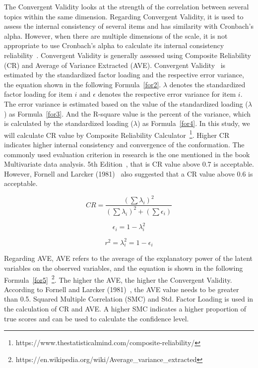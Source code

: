 The Convergent Validity looks at the strength of the correlation between several topics within the same dimension. 
Regarding Convergent Validity, it is used to assess the internal consistency of several items and has similarity with Cronbach's alpha. However, when there are multiple dimensions of the scale, it is not appropriate to use Cronbach's alpha to calculate its internal consistency reliability~\cite{ref29,ref30}. Convergent Validity is generally assessed using Composite Reliability (CR) and Average of Variance Extracted (AVE). Convergent Validity~\cite{ref33} is estimated by the standardized factor loading and the respective error variance, the equation shown in the following Formula~\ref{for2}. $\lambda$ denotes the standardized factor loading for item $i$ and $\epsilon$ denotes the respective error variance for item $i$. The error variance is estimated based on the value of the standardized loading ($\lambda$) as Formula~\ref{for3}. And the R-square value is the percent of the variance, which is calculated by the standardized loading ($\lambda$) as Formula~\ref{for4}. In this study, we will calculate CR value by Composite Reliability Calculator~\footnote{https://www.thestatisticalmind.com/composite-reliability/}. Higher CR indicates higher internal consistency and convergence of the conformation. The commonly used evaluation criterion in research is the one mentioned in the book Multivariate data analysis. 5th Edition~\cite{ref32}, that is CR value above 0.7 is acceptable. However, Fornell and Larcker (1981)~\cite{ref31} also suggested that a CR value above 0.6 is acceptable. 

\begin{equation}
\label{for2}
CR=\frac{(\sum \lambda_i )^2}{(\sum \lambda_i )^2+(\sum \epsilon _i )}
\end{equation}

\begin{equation}
\label{for3}
\epsilon_i = 1-\lambda_i^2  
\end{equation}

\begin{equation}
\label{for4}
r^2 = \lambda_i^2 = 1- \epsilon_i  
\end{equation}

Regarding AVE, AVE refers to the average of the explanatory power of the latent variables on the observed variables, and the equation is shown in the following Formula~\ref{for5}~\footnote{https://en.wikipedia.org/wiki/Average\_variance\_extracted}. The higher the AVE, the higher the Convergent Validity. According to Fornell and Larcker (1981)~\cite{ref31}, the AVE value needs to be greater than 0.5. Squared Multiple Correlation (SMC) and Std. Factor Loading is used in the calculation of CR and AVE. A higher SMC indicates a higher proportion of true scores and can be used to calculate the confidence level.

